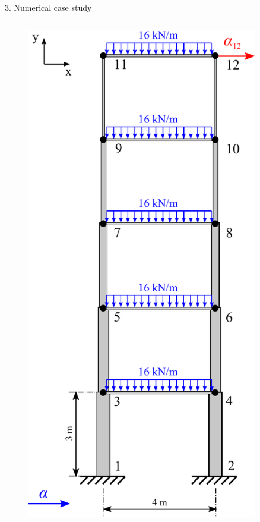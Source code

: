 \documentclass[10pt,xcolor = dvipsnames]{beamer}
\newcommand{\vc}[1]{\vspace*{#1cm}}
\begin{document}
\begin{frame}[t]{3. Numerical case study}

\vc{-0.2}{\small \bf A five-storey shear frame model}

\begin{columns}


\begin{figure}[t!]
\includegraphics[width = 0.9\textwidth]{ShearFrame5storey.pdf}
\end{figure}


\end{columns}
\end{frame}
\end{document}
